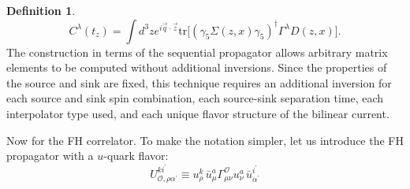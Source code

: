 \documentclass[prd,12pt,superscriptaddress,tightenlines,nofootinbib]{revtex4}
\DeclareMathOperator{\tr}{tr}
\def\mc#1{{\mathcal #1}}
\def\G{{\Gamma}}
\def\l{{\lambda}}
\def\ip{{i^\prime}}
\def\ap{{\alpha^\prime}}
\def\tr{\text{tr}}
\theoremstyle{plain}
\theoremstyle{definition}
\newtheorem{defn}[thm]{Definition}
\theoremstyle{remark}
\begin{document}
\begin{defn}
\begin{equation}
C^\l (t_z) = \int d^3 z  e^{i \vec{q} \cdot \vec{z}} \tr\Big[ \left( \gamma_{5} \Sigma(z,x) \gamma_{5}\right)^{\dagger} \G^\l D(z,x) \Big].
\end{equation}
The construction in terms of the sequential propagator allows arbitrary matrix elements to be computed without additional inversions. Since the properties of the source and sink are fixed, this technique requires an additional inversion for each source and sink spin combination, each source-sink separation time, each interpolator type used, and each unique flavor structure of the bilinear current. 






\bigskip

Now for the FH correlator.  To make the notation simpler, let us introduce the FH propagator with a $u$-quark flavor:
\begin{equation}
U_{\mc{O}, \rho\ap}^{k\ip} \equiv u^k_\rho\, \bar{u}^a_\mu \G^{\mc{O}}_{\mu\nu} u^a_\nu\, \bar{u}^\ip_\ap
\end{equation}


\end{defn}
\end{document}
